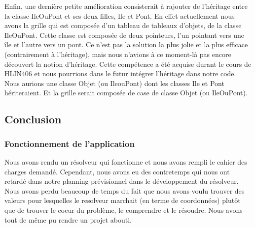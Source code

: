 \documentclass[french]{article}
\begin{document}
    \newline
    Enfin, une dernière petite amélioration consisterait à rajouter de l'héritage entre la classe IleOuPont et ses deux filles, Ile et Pont. En effet actuellement nous avons la grille qui est composée d'un tableau de tableaux d'objets, de la classe IleOuPont. Cette classe est composée de deux pointeurs, l'un pointant vers une île et l'autre vers un pont. Ce n'est pas la solution la plus jolie et la plus efficace (contrairement à l'héritage), mais nous n'avions à ce moment-là pas encore découvert la notion d'héritage. Cette compétence a été acquise durant le cours de HLIN406 et nous pourrions dans le futur intégrer l'héritage dans notre code. Nous aurions une classe Objet (ou IleouPont) dont les classes Ile et Pont hériteraient. Et la grille serait composée de case de classe Objet (ou IleOuPont).
    \subsection{\Large Conclusion}
        \subsubsection{\large Fonctionnement de l’application}
        \hspace{0.5cm} Nous avons rendu un résolveur qui fonctionne et nous avons rempli le cahier des charges demandé. Cependant, nous avons eu des contretemps qui nous ont retardé dans notre planning prévisionnel dans le développement du résolveur. Nous avons perdu beaucoup de temps du fait que nous avons voulu trouver des valeurs pour lesquelles le resolveur marchait (en terme de coordonnées) plutôt que de trouver le coeur du problème, le comprendre et le résoudre. Nous avons tout de même pu rendre un projet abouti.       
\end{document}
